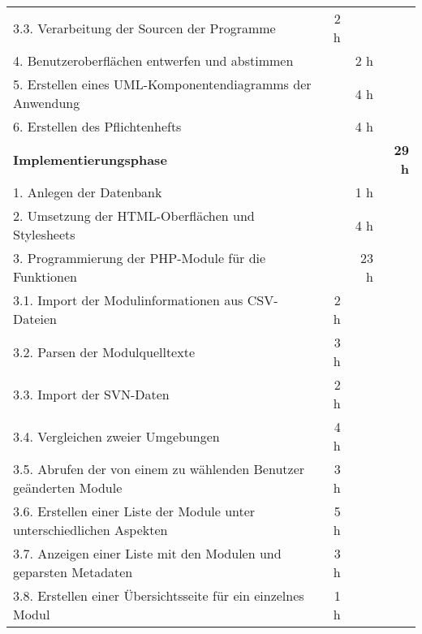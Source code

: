 \begin{tabularx}{\textwidth}{Xrrr}
    \rowcolor{odd}3.3. Verarbeitung der Sourcen der Programme                        & 2 h       &           &               \\
    4. Benutzeroberflächen entwerfen und abstimmen                                   &           & 2 h       &               \\
    \rowcolor{odd}5. Erstellen eines UML-Komponentendiagramms der Anwendung          &           & 4 h       &               \\
    6. Erstellen des Pflichtenhefts                                                  &           & 4 h       &               \\
    \rowcolor{heading}\textbf{Implementierungsphase}                                 & \textbf{} & \textbf{} & \textbf{29 h} \\
    1. Anlegen der Datenbank                                                         &           & 1 h       &               \\
    \rowcolor{odd}2. Umsetzung der HTML-Oberflächen und Stylesheets                  &           & 4 h       &               \\
    3. Programmierung der PHP-Module für die Funktionen                              &           & 23 h      &               \\
    \rowcolor{odd}3.1. Import der Modulinformationen aus CSV-Dateien                 & 2 h       &           &               \\
    3.2. Parsen der Modulquelltexte                                                  & 3 h       &           &               \\
    \rowcolor{odd}3.3. Import der SVN-Daten                                          & 2 h       &           &               \\
    3.4. Vergleichen zweier Umgebungen                                               & 4 h       &           &               \\
    \rowcolor{odd}3.5. Abrufen der von einem zu wählenden Benutzer geänderten Module & 3 h       &           &               \\
    3.6. Erstellen einer Liste der Module unter unterschiedlichen Aspekten           & 5 h       &           &               \\
    \rowcolor{odd}3.7. Anzeigen einer Liste mit den Modulen und geparsten Metadaten  & 3 h       &           &               \\
    3.8. Erstellen einer Übersichtsseite für ein einzelnes Modul                     & 1 h       &           &               \\

\end{tabularx}

